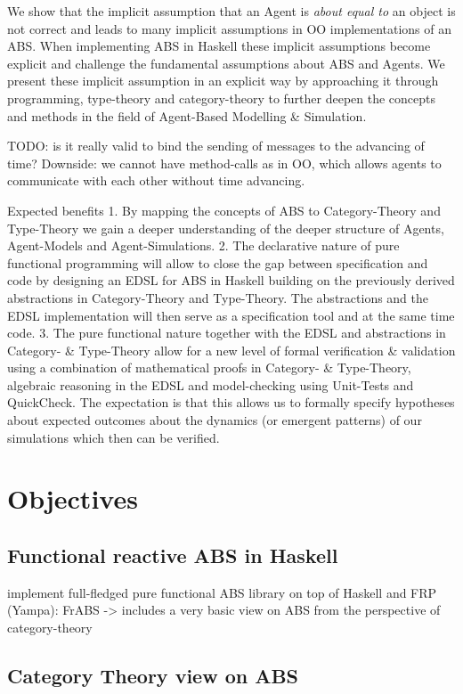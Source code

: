 We show that the implicit assumption that an Agent is \textit{about equal to} an object is not correct and leads to many implicit assumptions in OO implementations of an ABS. When implementing ABS in Haskell these implicit assumptions become explicit and challenge the fundamental assumptions about ABS and Agents. We present these implicit assumption in an explicit way by approaching it through programming, type-theory and category-theory to further deepen the concepts and methods in the field of Agent-Based Modelling \& Simulation.

TODO: is it really valid to bind the sending of messages to the advancing of time?
Downside: we cannot have method-calls as in OO, which allows agents to communicate with each other without time advancing. 

Expected benefits
1. By mapping the concepts of ABS to Category-Theory and Type-Theory we gain a deeper understanding of the deeper structure of Agents, Agent-Models and Agent-Simulations.
2. The declarative nature of pure functional programming will allow to close the gap between specification and code by designing an EDSL for ABS in Haskell building on the previously derived abstractions in Category-Theory and Type-Theory. The abstractions and the EDSL implementation will then serve as a specification tool and at the same time code.
3. The pure functional nature together with the EDSL and abstractions in Category- \& Type-Theory allow for a new level of formal verification \& validation using a combination of mathematical proofs in Category- \& Type-Theory, algebraic reasoning in the EDSL and model-checking using Unit-Tests and QuickCheck. The expectation is that this allows us to formally specify hypotheses about expected outcomes about the dynamics (or emergent patterns) of our simulations which then can be verified.
	
\section{Objectives}
\subsection{Functional reactive ABS in Haskell}
implement full-fledged pure functional ABS library on top of Haskell and FRP (Yampa): FrABS
	-> includes a very basic view on ABS from the perspective of category-theory
	
\subsection{Category Theory view on ABS}

